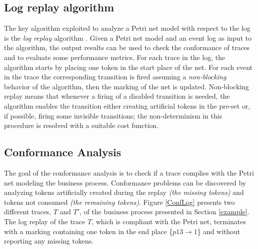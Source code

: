 \documentclass{llncs}
\begin{document}
\subsection{Log replay algorithm}\label{logreplayAlg}
The key algorithm exploited to analyze a Petri net model with respect to the log is the {\itshape log replay} algorithm \cite{DBLP:journals/widm/AalstAD12}\cite{DBLP:journals/is/RozinatA08}\cite{DBLP:conf/bpm/Munoz-GamaC10}. Given a Petri net model and an event log as input to the algorithm, the output results can be used to check the conformance of traces and to evaluate some performance metrics. For each trace in the log, the algorithm starts by placing one token in the start place of the net. For each event in the trace the corresponding transition is fired assuming a {\itshape non-blocking} behavior of the algorithm, then the marking of the net is updated. Non-blocking replay means that whenever a firing of a disabled transition is needed, the algorithm enables the transition either creating artificial tokens in the pre-set or, if possible, firing some invisible transitions; the non-determinism in this procedure is resolved with a suitable cost function. %


\subsection{Conformance Analysis}\label{ConformanceAnalysis}
The goal of the conformance analysis is to check if a trace complies with the Petri net modeling the business process. Conformance problems can be discovered by analyzing tokens artificially created during the replay {\itshape (the missing tokens)} and tokens not consumed {\itshape (the remaining tokens)}. Figure \ref{ConfLog}  presents two different traces, $T$ and $T'$, of the business process presented in Section \ref{example}. The log replay of the trace $T$, which is compliant with the Petri net, terminates with a marking containing one token in the end place \{${p13 \rightarrow 1}$\} and without reporting any missing tokens.

\end{document}
